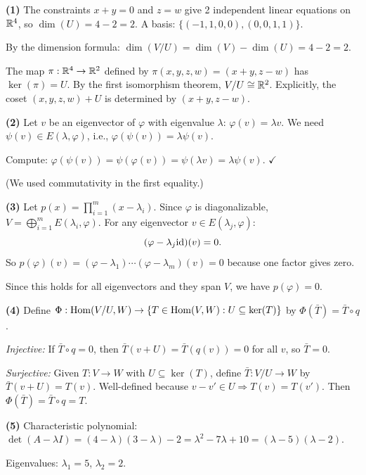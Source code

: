 \documentclass{report}
\begin{document}
\begin{solution}
\textbf{(1)} The constraints \(x + y = 0\) and \(z = w\) give 2 independent linear equations on \(\RR^4\), so \(\dim(U) = 4 - 2 = 2\). A basis: \(\{(-1, 1, 0, 0), (0, 0, 1, 1)\}\).

By the dimension formula: \(\dim(V/U) = \dim(V) - \dim(U) = 4 - 2 = 2\).

The map \(\pi : \RR^4 \to \RR^2\) defined by \(\pi(x, y, z, w) = (x + y, z - w)\) has \(\ker(\pi) = U\). By the first isomorphism theorem, \(V/U \cong \RR^2\). Explicitly, the coset \((x, y, z, w) + U\) is determined by \((x + y, z - w)\).

\textbf{(2)} Let \(v\) be an eigenvector of \(\varphi\) with eigenvalue \(\lambda\): \(\varphi(v) = \lambda v\). We need \(\psi(v) \in E(\lambda, \varphi)\), i.e., \(\varphi(\psi(v)) = \lambda \psi(v)\).

Compute: \(\varphi(\psi(v)) = \psi(\varphi(v)) = \psi(\lambda v) = \lambda \psi(v)\). $\checkmark$

(We used commutativity in the first equality.)

\textbf{(3)} Let \(p(x) = \prod_{i=1}^m (x - \lambda_i)\). Since \(\varphi\) is diagonalizable, \(V = \bigoplus_{i=1}^m E(\lambda_i, \varphi)\). For any eigenvector \(v \in E(\lambda_j, \varphi)\):
\[(\varphi - \lambda_j \text{id})(v) = 0.\]
So \(p(\varphi)(v) = (\varphi - \lambda_1) \cdots (\varphi - \lambda_m)(v) = 0\) because one factor gives zero.

Since this holds for all eigenvectors and they span \(V\), we have \(p(\varphi) = 0\).

\textbf{(4)} Define \(\Phi : \operatorname{Hom}(V/U, W) \to \{T \in \operatorname{Hom}(V, W) : U \subseteq \ker(T)\}\) by \(\Phi(\bar{T}) = \bar{T} \circ q\).

\emph{Injective:} If \(\bar{T} \circ q = 0\), then \(\bar{T}(v + U) = \bar{T}(q(v)) = 0\) for all \(v\), so \(\bar{T} = 0\).

\emph{Surjective:} Given \(T : V \to W\) with \(U \subseteq \ker(T)\), define \(\bar{T} : V/U \to W\) by \(\bar{T}(v + U) = T(v)\). Well-defined because \(v - v' \in U \Rightarrow T(v) = T(v')\). Then \(\Phi(\bar{T}) = \bar{T} \circ q = T\).

\textbf{(5)} Characteristic polynomial: \(\det(A - \lambda I) = (4 - \lambda)(3 - \lambda) - 2 = \lambda^2 - 7\lambda + 10 = (\lambda - 5)(\lambda - 2)\).

Eigenvalues: \(\lambda_1 = 5\), \(\lambda_2 = 2\).


\end{solution}
\end{document}
